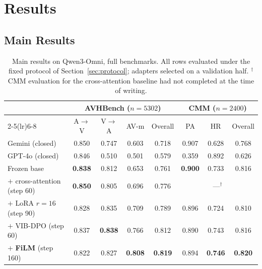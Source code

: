 \documentclass[11pt,a4paper,oneside]{article}
\renewcommand{\arraystretch}{1.15}
\begin{document}
\clearpage
\section{Results}
\label{sec:results}

\subsection{Main Results}
\label{sec:main-results}

\begin{table}[h]
\centering
\small
\renewcommand{\arraystretch}{1.2}
\begin{tabular}{lccccccc}
\toprule
& \multicolumn{4}{c}{AVHBench ($n=5302$)} & \multicolumn{3}{c}{CMM ($n=2400$)} \\
\cmidrule(lr){2-5}\cmidrule(lr){6-8}
 & A$\to$V & V$\to$A & AV-m & Overall & PA & HR & Overall \\
\midrule
Gemini (closed) & 0.850 & 0.747 & 0.603 & 0.718 & 0.907 & 0.628 & 0.768 \\
GPT-4o (closed) & 0.846 & 0.510 & 0.501 & 0.579 & 0.359 & 0.892 & 0.626 \\
\midrule
Frozen base                    & \textbf{0.838} & 0.812 & 0.653 & 0.761 & \textbf{0.900} & 0.733 & 0.816 \\
$+$ cross-attention (step 60)  & \textbf{0.850} & 0.805 & 0.696 & 0.776 & \multicolumn{3}{c}{---$^\dagger$} \\
$+$ LoRA $r{=}16$ (step 90)    & 0.828 & 0.835 & 0.709 & 0.789 & 0.896 & 0.724 & 0.810 \\
$+$ VIB-DPO (step 60)         & 0.837 & \textbf{0.838} & 0.766 & 0.812 & 0.890 & 0.743 & 0.816 \\
$+$ \textbf{FiLM} (step 160)   & 0.822 & 0.827 & \textbf{0.808} & \textbf{0.819} & 0.894 & \textbf{0.746} & \textbf{0.820} \\
\bottomrule
\end{tabular}
\caption{Main results on Qwen3-Omni, full benchmarks. All rows evaluated under the fixed protocol of
Section~\ref{sec:protocol}; adapters selected on a validation half. $^\dagger$CMM evaluation for the
cross-attention baseline had not completed at the time of writing.}
\label{tab:main-results}
\end{table}
\end{document}
